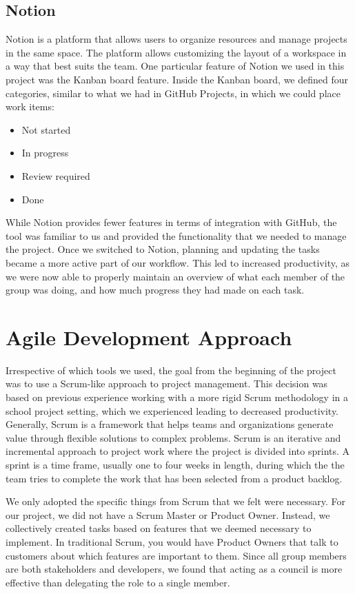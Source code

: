 \subsection{Notion}
Notion is a platform that allows users to organize resources and manage projects in the same space. The platform allows customizing the layout of a workspace in a way that best suits the team. One particular feature of Notion we used in this project was the Kanban board feature. Inside the Kanban board, we defined four categories, similar to what we had in GitHub Projects, in which we could place work items:

\begin{itemize}
    \item Not started
    \item In progress
    \item Review required
    \item Done
\end{itemize}

While Notion provides fewer features in terms of integration with GitHub, the tool was familiar to us and provided the functionality that we needed to manage the project.
Once we switched to Notion, planning and updating the tasks became a more active part of our workflow. This led to increased productivity, as we were now able to properly maintain an overview of what each member of the group was doing, and how much progress they had made on each task.

\section{Agile Development Approach} \label{sec:agile-dev}
Irrespective of which tools we used, the goal from the beginning of the project was to use a Scrum-like approach to project management.
This decision was based on previous experience working with a more rigid Scrum methodology in a school project setting, which we experienced leading to decreased productivity.
Generally, Scrum is a framework that helps teams and organizations generate value through flexible solutions to complex problems. Scrum is an iterative and incremental approach to project work where the project is divided into sprints. A sprint is a time frame, usually one to four weeks in length, during which the the team tries to complete the work that has been selected from a product backlog\cite{sutherlandScrumArtDoing2014}.

We only adopted the specific things from Scrum that we felt were necessary. For our project, we did not have a Scrum Master or Product Owner. Instead, we collectively created tasks based on features that we deemed necessary to implement.
In traditional Scrum, you would have Product Owners that talk to customers about which features are important to them. Since all group members are both stakeholders and developers, we found that acting as a council is more effective than delegating the role to a single member.


